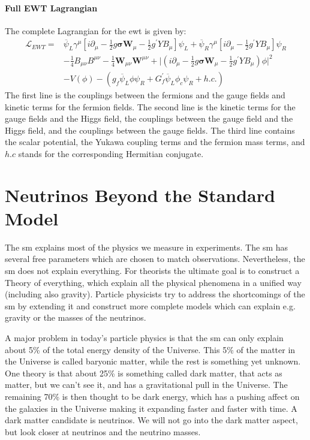 \documentclass[a4paper, american, 12pt]{report}
\begin{document}
	
	\subsubsection{Full EWT Lagrangian}
	\label{subsubsect:Theory-Full_L}
	The complete Lagrangian for the \acrshort{ewt} is given by:
	\begin{align}
	\label{eq:Full_EWT}
		\mathcal{L}_{EWT}=& \overline{\psi}_L\gamma^{\mu}
		\left[i\partial_{\mu}-\frac{1}{2}g\boldsymbol{\sigma}\textbf{W}_{\mu}-\frac{1}{2}g^{\prime}YB_{\mu}\right]
		\psi_L +\overline{\psi}_R\gamma^{\mu}\left[i\partial_{\mu}-\frac{1}{2}g^{\prime}YB_{\mu}\right]\psi_R \nonumber\\ 
		&-\frac{1}{4}B_{\mu\nu}B^{\mu\nu} -\frac{1}{4}\textbf{W}_{\mu\nu}\textbf{W}^{\mu\nu} +\bigg|\left(i\partial_{\mu}-\frac{1}{2}g\boldsymbol{\sigma}\textbf{W}_{\mu}-\frac{1}{2}g^{\prime}YB_{\mu}\right)\phi\bigg|^2 \nonumber\\
		&-V(\phi) -(g_f\overline{\psi}_L\phi\psi_R +G_f^{\prime}\overline{\psi}_L\phi_c\psi_R+h.c.)
	\end{align}
	The first line is the couplings between the fermions and the gauge fields and kinetic terms for the fermion fields. The second line is the kinetic terms for the gauge fields and the Higgs field, the couplings between the gauge field and the Higgs field, and the couplings between the gauge fields. The third line contains the scalar potential, the Yukawa coupling terms and the fermion mass terms, and $h.c$ stands for the corresponding Hermitian conjugate.
	
	

	\chapter{Neutrinos Beyond the Standard Model}
	\label{chap:Theory-Beyond_SM} 
	The \acrshort{sm} explains most of the physics we measure in  experiments. The \acrshort{sm} has several free parameters which are chosen to match observations. Nevertheless, the \acrshort{sm} does not explain everything. For theorists the ultimate goal is to construct a Theory of everything, which explain all the physical phenomena in a unified way (including also gravity). Particle physicists try to address the shortcomings of the \acrshort{sm} by extending it and construct more complete models which can explain e.g. gravity or the masses of the neutrinos.
	
	A major problem in today's particle physics is that the \acrshort{sm} can only explain about 5\% of the total energy density of the Universe. This 5\% of the matter in the Universe is called baryonic matter, while the rest is something yet unknown. One theory is that about 25\% is something called dark matter, that acts as matter, but we can't see it, and has a gravitational pull in the Universe. The remaining 70\% is then thought to be dark energy, which has a pushing affect on the galaxies in the Universe making it expanding faster and faster with time. A dark matter candidate is neutrinos. We will not go into the dark matter aspect, but look closer at neutrinos and the neutrino masses.
\end{document}
